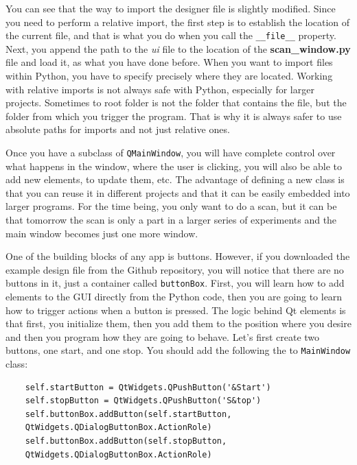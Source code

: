 You can see that the way to import the designer file is slightly
modified. Since you need to perform a relative import, the first step is
to establish the location of the current file, and that is what you do
when you call the \texttt{__file__} property. Next, you append the
path to the \emph{ui} file to the location of the
\textbf{scan\_window.py} file and load it, as what you have done before.
When you want to import files within Python, you have to specify
precisely where they are located. Working with relative imports is not
always safe with Python, especially for larger projects. Sometimes to
root folder is not the folder that contains the file, but the folder
from which you trigger the program. That is why it is always safer to
use absolute paths for imports and not just relative ones.

Once you have a subclass of \texttt{QMainWindow}, you will have complete
control over what happens in the window, where the user is clicking, you
will also be able to add new elements, to update them, etc. The advantage of defining a new class is that you can reuse it in different
projects and that it can be easily embedded into larger programs. For
the time being, you only want to do a scan, but it can be that tomorrow
the scan is only a part in a larger series of experiments and the main
window becomes just one more window.

One of the building blocks of any app is buttons. However, if you
downloaded the example design file from the Github repository, you will
notice that there are no buttons in it, just a container called
\texttt{buttonBox}. First, you will learn how to add elements to the
{GUI} directly from the Python code, then you are going to learn how to
trigger actions when a button is pressed. The logic behind Qt elements
is that first, you initialize them, then you add them to the position
where you desire and then you program how they are going to behave.
Let's first create two buttons, one start, and one stop. You should add
the following the to \texttt{MainWindow} class:

\begin{verbatim}
    self.startButton = QtWidgets.QPushButton('&Start')
    self.stopButton = QtWidgets.QPushButton('S&top')
    self.buttonBox.addButton(self.startButton,
    QtWidgets.QDialogButtonBox.ActionRole)
    self.buttonBox.addButton(self.stopButton,
    QtWidgets.QDialogButtonBox.ActionRole)
\end{verbatim}

